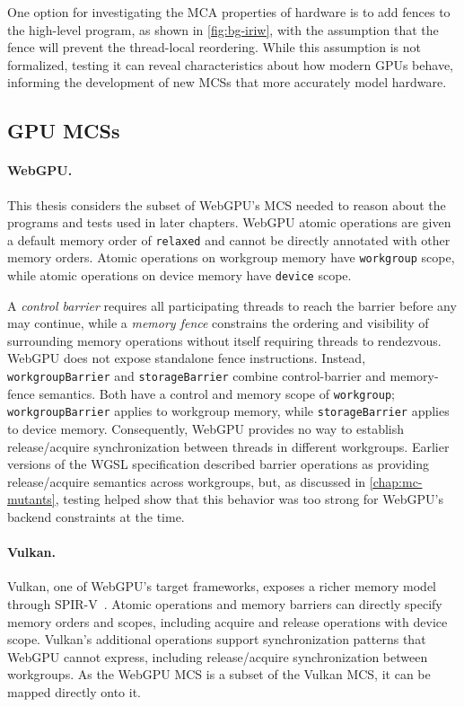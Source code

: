 One option for investigating the MCA properties of hardware is to add fences to the high-level program, as shown in \myfig\ref{fig:bg-iriw}, with the assumption that the fence will prevent the thread-local reordering. While this assumption is not formalized, testing it can reveal characteristics about how modern GPUs behave, informing the development of new MCSs that more accurately model hardware.

\subsection{GPU MCSs}

\paragraph{WebGPU.}
This thesis considers the subset of WebGPU's MCS needed to reason about the programs and tests used in later chapters. WebGPU atomic operations are given a default memory order of \texttt{relaxed} and cannot be directly annotated with other memory orders. Atomic operations on workgroup memory have \texttt{workgroup} scope, while atomic operations on device memory have \texttt{device} scope.

A \textit{control barrier} requires all participating threads to reach the barrier before any may continue, while a \textit{memory fence} constrains the ordering and visibility of surrounding memory operations without itself requiring threads to rendezvous. WebGPU does not expose standalone fence instructions. Instead, \texttt{workgroupBarrier} and \texttt{storageBarrier} combine control-barrier and memory-fence semantics. Both have a control and memory scope of \texttt{workgroup}; \texttt{workgroupBarrier} applies to workgroup memory, while \texttt{storageBarrier} applies to device memory. Consequently, WebGPU provides no way to establish release/acquire synchronization between threads in different workgroups. Earlier versions of the WGSL specification described barrier operations as providing release/acquire semantics across workgroups, but, as discussed in \mychap\ref{chap:mc-mutants}, testing helped show that this behavior was too strong for WebGPU's backend constraints at the time.

\paragraph{Vulkan.}
Vulkan, one of WebGPU's target frameworks, exposes a richer memory model through SPIR-V~\cite{spir-v}. Atomic operations and memory barriers can directly specify memory orders and scopes, including acquire and release operations with device scope. Vulkan's additional operations support synchronization patterns that WebGPU cannot express, including release/acquire synchronization between workgroups. As the WebGPU MCS is a subset of the Vulkan MCS, it can be mapped directly onto it.

